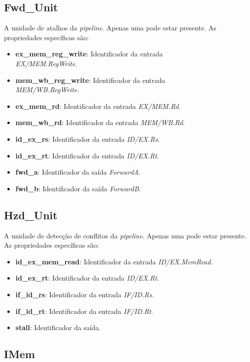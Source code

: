\documentclass[11pt,a4paper,twoside,titlepage]{report}
\begin{document}
\subsection{Fwd\_Unit}

A unidade de atalhos da \emph{pipeline}. Apenas uma pode estar presente.
As propriedades específicas são:
\begin{itemize}
	\item \textbf{ex\_mem\_reg\_write}: Identificador da entrada\\ \emph{EX/MEM.RegWrite}.
	\item \textbf{mem\_wb\_reg\_write}: Identificador da entrada\\ \emph{MEM/WB.RegWrite}.
	\item \textbf{ex\_mem\_rd}: Identificador da entrada \emph{EX/MEM.Rd}.
	\item \textbf{mem\_wb\_rd}: Identificador da entrada \emph{MEM/WB.Rd}.
	\item \textbf{id\_ex\_rs}: Identificador da entrada \emph{ID/EX.Rs}.
	\item \textbf{id\_ex\_rt}: Identificador da entrada \emph{ID/EX.Rt}.
	\item \textbf{fwd\_a}: Identificador da saída \emph{ForwardA}.
	\item \textbf{fwd\_b}: Identificador da saída \emph{ForwardB}.
\end{itemize}

\subsection{Hzd\_Unit}
A unidade de detecção de conflitos da \emph{pipeline}. Apenas uma pode estar
presente.
As propriedades específicas são:
\begin{itemize}
	\item \textbf{id\_ex\_mem\_read}: Identificador da entrada \emph{ID/EX.MemRead}.
	\item \textbf{id\_ex\_rt}: Identificador da entrada \emph{ID/EX.Rt}.
	\item \textbf{if\_id\_rs}: Identificador da entrada \emph{IF/ID.Rs}.
	\item \textbf{if\_id\_rt}: Identificador da entrada \emph{IF/ID.Rt}.
	\item \textbf{stall}: Identificador da saída.
\end{itemize}

\subsection{IMem}
\end{document}
